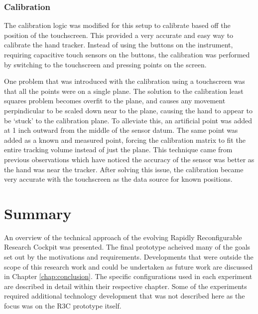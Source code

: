\subsubsection{Calibration}

The calibration logic was modified for this setup to calibrate based off the position of the touchscreen.
This provided a very accurate and easy way to calibrate the hand tracker.
Instead of using the buttons on the instrument, requiring capacitive touch sensors on the buttons, the calibration was performed by switching to the touchscreen and pressing points on the screen.

One problem that was introduced with the calibration using a touchscreen was that all the points were on a single plane.
The solution to the calibration least squares problem becomes overfit to the plane, and causes any movement perpindicular to be scaled down near to the plane, causing the hand to appear to be `stuck' to the calibration plane.
To alleviate this, an artificial point was added at 1 inch outward from the middle of the sensor datum.
The same point was added as a known and measured point, forcing the calibration matrix to fit the entire tracking volume instead of just the plane.
This technique came from previous observations which have noticed the accuracy of the sensor was better as the hand was near the tracker.
After solving this issue, the calibration became very accurate with the touchscreen as the data source for known positions.

\section{Summary}

An overview of the technical approach of the evolving Rapidly Reconfigurable Research Cockpit was presented.
The final prototype acheived many of the goals set out by the motivations and requirements.
Developments that were outside the scope of this research work and could be undertaken as future work are discussed in Chapter \ref{chap:conclusion}.
The specific configurations used in each experiment are described in detail within their respective chapter.
Some of the experiments required additional technology development that was not described here as the focus was on the R3C prototype itself.

